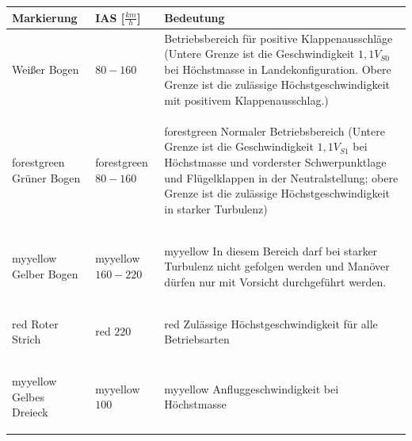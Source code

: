 \begin{tabular}{|m{}|m{}|m{6cm}|}
\hline
Markierung & IAS [$\frac{km}{h}$] & Bedeutung \\
\hline
Weißer Bogen & $80-160$ & Betriebsbereich für positive Klappenausschläge (Untere Grenze ist die Geschwindigkeit $1,1 V_{S0}$ bei Höchstmasse in Landekonfiguration. Obere Grenze ist die zulässige Höchstgeschwindigkeit mit positivem Klappenausschlag.)\\
\hline
\begin{color}{forestgreen} Grüner Bogen \end{color} & \begin{color}{forestgreen} $80-160$ \end{color} & \begin{color}{forestgreen} Normaler Betriebsbereich (Untere Grenze ist die Geschwindigkeit $1,1 V_{S1}$ bei Höchstmasse und vorderster Schwerpunktlage und Flügelklappen in der Neutralstellung; obere Grenze ist die zulässige Höchstgeschwindigkeit in starker Turbulenz) \end{color} \\ 
\hline
\begin{color}{myyellow} Gelber Bogen \end{color} & \begin{color}{myyellow} $160-220$ \end{color} & \begin{color}{myyellow} In diesem Bereich darf bei starker Turbulenz nicht gefolgen werden und Manöver dürfen nur mit Vorsicht durchgeführt werden. \end{color}\\
\hline
\begin{color}{red} Roter Strich \end{color} & \begin{color}{red} $220$ \end{color} & \begin{color}{red} Zulässige Höchstgeschwindigkeit für alle Betriebsarten \end{color}\\
\hline
\begin{color}{myyellow} Gelbes Dreieck \end{color} & \begin{color}{myyellow} $100$ \end{color} & \begin{color}{myyellow} Anfluggeschwindigkeit bei Höchstmasse \end{color}\\
\hline

\end{tabular}
\newpage
